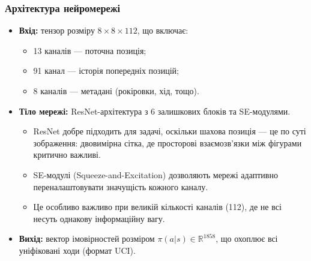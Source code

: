 \documentclass[
    10pt,
]{beamer}
\begin{document}
\begin{frame}[t]
    \frametitle{Архітектура нейромережі}

    \begin{itemize}
        \item \textbf{Вхід:} тензор розміру \(8 \times 8 \times 112\), що включає:
        \begin{itemize}
            \item 13 каналів — поточна позиція;
            \item 91 канал — історія попередніх позицій;
            \item 8 каналів — метадані (рокіровки, хід, тощо).
        \end{itemize}
        
        \item \textbf{Тіло мережі:} ResNet-архітектура з 6 залишкових блоків та SE-модулями.
        \begin{itemize}
            \item ResNet добре підходить для задачі, оскільки шахова позиція — це по суті зображення: двовимірна сітка, де просторові взаємозв’язки між фігурами критично важливі.
            \item SE-модулі (Squeeze-and-Excitation) дозволяють мережі адаптивно переналаштовувати значущість кожного каналу.
            \item Це особливо важливо при великій кількості каналів (112), де не всі несуть однакову інформаційну вагу.
        \end{itemize}


        \item \textbf{Вихід:} вектор імовірностей розміром \( \pi(a|s) \in \mathbb{R}^{1858} \), що охоплює всі уніфіковані ходи (формат UCI).
        
    
    \end{itemize}
\end{frame}
\end{document}
